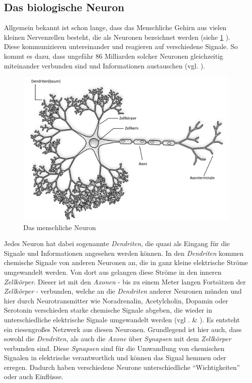 \documentclass[parskip=half,titlepage]{scrartcl}
\begin{document}
\subsection{Das biologische Neuron}
Allgemein bekannt ist schon lange, dass das Menschliche Gehirn aus vielen kleinen Nervenzellen besteht, die als Neuronen bezeichnet werden (siehe \cref{fig:biologisches_neuron} ). Diese kommunizieren untereinander und reagieren auf verschiedene Signale. So kommt es dazu, dass ungefähr 86 Milliarden solcher Neuronen gleichzeitig miteinander verbunden sind und Informationen austauschen (vgl. \cite[29]{Steinwendner2019}).\\


\begin{figure}[h]
 \centering
 \includegraphics[scale=0.35]{Abbildungen/biologischesNeuron.png}
 \caption{Das menschliche Neuron}
 \label{fig:biologisches_neuron}
\end{figure}


Jedes Neuron hat dabei sogenannte \textit{Dendriten}, die quasi als Eingang für die Signale und Informationen angesehen werden können. In den \textit{Dendriten} kommen chemische Signale von anderen Neuronen an, die in ganz kleine elektrische Ströme umgewandelt werden. Von dort aus gelangen diese Ströme in den inneren \textit{Zellkörper}. Dieser ist mit den \textit{Axonen} - bis zu einem Meter langen Fortsätzen der \textit{Zellkörper} - verbunden, welche an die \textit{Dendriten} anderer Neuronen münden und hier durch Neurotransmitter wie Noradrenalin, Acetylcholin, Dopamin oder Serotonin verschieden starke chemische Signale abgeben, die wieder in unterschiedliche elektrische Signale umgewandelt werden (vgl . \cite[29-30]{Steinwendner2019} \& \cite{rundfunk_2019}). Es entsteht ein riesengroßes Netzwerk aus diesen Neuronen. Grundlegend ist hier auch, dass sowohl die \textit{Dendriten}, als auch die \textit{Axone} über \textit{Synapsen} mit dem \textit{Zellkörper} verbunden sind. Diese \textit{Synapsen} sind für die Umwandlung von chemischen Signalen in elektrische verantwortlich und können das Signal hemmen oder erregen. Dadurch haben verschiedene Neurone unterschiedliche ``Wichtigkeiten'' oder auch Einflüsse.
\end{document}
